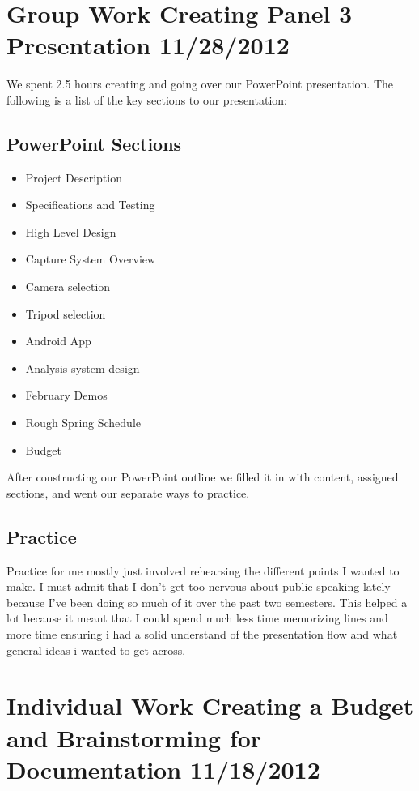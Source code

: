 \documentclass[]{article}
\begin{document}
	\section{Group Work Creating Panel 3 Presentation 11/28/2012}
	
	We spent 2.5 hours creating and going over our PowerPoint presentation. The following is a list of the key sections to our presentation: \\
	
		\subsection{PowerPoint Sections}	
			\begin{itemize}
				\item Project Description
				\item Specifications and Testing
				\item High Level Design
				\item Capture System Overview
				\item Camera selection
				\item Tripod selection
				\item Android App
				\item Analysis system design
				\item February Demos
				\item Rough Spring Schedule
				\item Budget
			\end{itemize}
			
			After constructing our PowerPoint outline we filled it in with content, assigned sections, and went our separate ways to practice.			
			
		\subsection{Practice}
			Practice for me mostly just involved rehearsing the different points I wanted to make. I must admit that I don't get too nervous about public speaking lately because I've been doing so much of it over the past two semesters. This helped a lot because it meant that I could spend much less time memorizing lines and more time ensuring i had a solid understand of the presentation flow and what general ideas i wanted to get across.
		
	
	\section{Individual Work Creating a Budget and Brainstorming for Documentation 11/18/2012}
	
\end{document}
